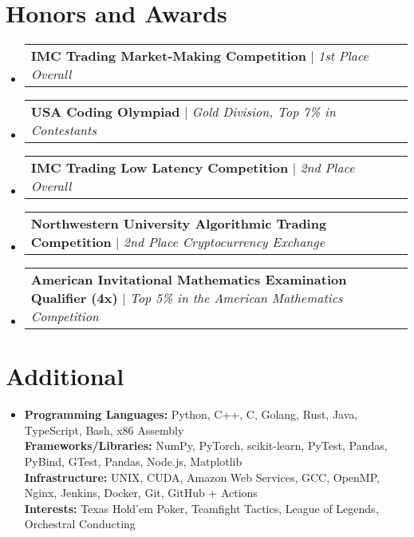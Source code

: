 \documentclass[letterpaper,11pt]{article}
\makeatletter
\newcommand{\resumeAwardHeading}[2]{
    \vspace{-2pt}\item
        \begin{tabular*}{\textwidth}[t]{l@{\extracolsep{\fill}}r}
          \textbf{#1} $|$ \textit{#2} \\
        \end{tabular*}\vspace{-8.5pt}
}
\newcommand{\resumeSubHeadingListStart}{\begin{itemize}[leftmargin=0in, rightmargin=0in, label={}]}
\newcommand{\resumeSubHeadingListEnd}{\end{itemize}}
\makeatother
\begin{document}
\section*{Honors and Awards}
    \resumeSubHeadingListStart

      \resumeAwardHeading   
        {IMC Trading Market-Making Competition}{1st Place Overall}

      \resumeAwardHeading
        {USA Coding Olympiad}{Gold Division, Top 7\% in Contestants}

      \resumeAwardHeading
        {IMC Trading Low Latency Competition}{2nd Place Overall}

      \resumeAwardHeading
        {Northwestern University Algorithmic Trading Competition}{2nd Place Cryptocurrency Exchange}

      \resumeAwardHeading
        {American Invitational Mathematics Examination Qualifier (4x)}{Top 5\% in the American Mathematics Competition}
      
      \vspace{-4pt}

    \resumeSubHeadingListEnd
%

\section*{Additional}
 \begin{itemize}[leftmargin=0in, rightmargin=0in, label={}]
    \item{
     \textbf{Programming Languages:} Python, C++, C, Golang, Rust, Java, TypeScript, Bash, x86 Assembly \\
     \textbf{Frameworks/Libraries:} NumPy, PyTorch, scikit-learn, PyTest, Pandas, PyBind, GTest, Pandas, Node.js, Matplotlib\\
     \textbf{Infrastructure:} UNIX, CUDA, Amazon Web Services, GCC, OpenMP, Nginx, Jenkins, Docker, Git, GitHub + Actions \\ 
     \textbf{Interests:} Texas Hold'em Poker, Teamfight Tactics, League of Legends, Orchestral Conducting
    }
 \end{itemize}
%
\end{document}
